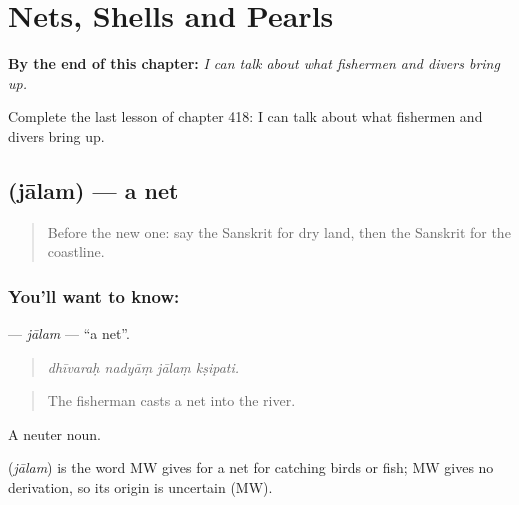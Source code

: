 
\chapter{Nets, Shells and Pearls}
\label{ch:sa-nets-shells-and-pearls}

\begin{chapteropening}
\textbf{By the end of this chapter:} \emph{I can talk about what fishermen and divers bring up.}

Complete the last lesson of chapter 418: I can talk about what fishermen and divers bring up.
\end{chapteropening}

\section[\texorpdfstring{\sk{जालम्} (jālam)}{जालम् (jālam)}]{ (jālam) — a net}

\label{lesson:SA-C418-jalam}



\begin{quote}
Before the new one: say the Sanskrit for dry land, then the Sanskrit for the coastline.
\end{quote}

\subsection*{You'll want to know: }
\textbf{} — \emph{jālam} — \textquotedblleft{}a net\textquotedblright{}.

\begin{quote}
   
\end{quote}

\begin{quote}
\emph{dhīvaraḥ nadyāṃ jālaṃ kṣipati.}
\end{quote}

\begin{quote}
The fisherman casts a net into the river.
\end{quote}

A neuter noun.

\begin{cousinweb}
\textbf{} (\emph{jālam}) is the word MW gives for a net for catching birds or fish; MW gives no derivation, so its origin is uncertain (MW).
\end{cousinweb}

